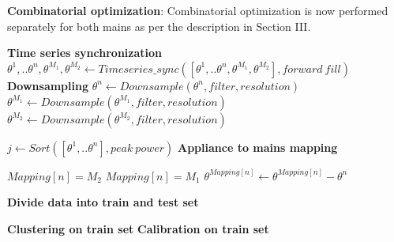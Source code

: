 \documentclass[conference]{IEEEtran}
\begin{document}
\noindent\textbf{Combinatorial optimization}: Combinatorial optimization is now performed separately for both mains as per the description in Section III.


\begin{algorithm}[ht!]
\DontPrintSemicolon %
\BlankLine
\textbf{Time series synchronization}\;
\BlankLine
\nl$\theta^1,..\theta^n,\theta^{M_1},\theta^{M_2} \gets Timeseries\_sync([\theta^1,..\theta^n,\theta^{M_1},\theta^{M_2}],forward\: fill)$\;
\BlankLine
\textbf{Downsampling}
\BlankLine
\nl {}
    {
    $\theta^n \gets Downsample(\theta^n,filter,resolution)$\;
    }
\nl $\theta^{M_1} \gets Downsample(\theta^{M_1},filter,resolution)$\;
\nl $\theta^{M_2} \gets Downsample(\theta^{M_2},filter,resolution)$\;


\nl $j \gets Sort([\theta^1,..\theta^n],peak\: power)$\;
\BlankLine
\textbf{Appliance to mains mapping}\;
\BlankLine
\nl {}
    {
    
\nl {} 
        { $Mapping[n]=M_2$\;        
        }  
\nl {}
        { $Mapping[n]=M_1$\;
        }
\nl {}
    \nl $\theta^{Mapping[n]} \gets \theta^{Mapping[n]} - \theta^n $ \;
    }
    \BlankLine
    \textbf{Divide data into train and test set}\;
    \BlankLine
    
        
        \BlankLine
        \textbf{Clustering on train set}\;
        \BlankLine
    \nl {}
    \BlankLine
    \textbf{Calibration on train set} \;
    \BlankLine
\nl {}
\end{algorithm}
\end{document}
